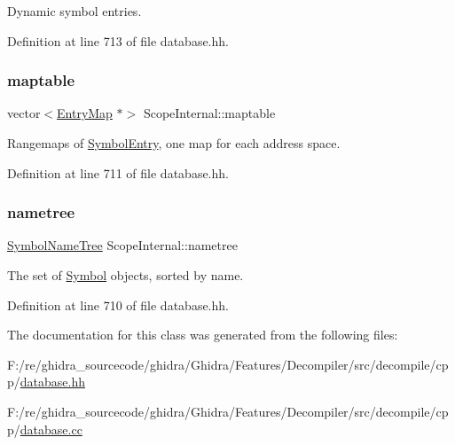 Dynamic symbol entries. 



Definition at line 713 of file database.\+hh.

\mbox{\label{class_scope_internal_ab5658fe9f8073010df73298690099872}} 
\subsubsection{\texorpdfstring{maptable}{maptable}}
{\footnotesize\ttfamily vector$<$\mbox{\hyperlink{database_8hh_a44a8ea0c0009b316b2651d374e5d4260}{Entry\+Map}} $\ast$$>$ Scope\+Internal\+::maptable\hspace{0.3cm}{\ttfamily [protected]}}



Rangemaps of \mbox{\hyperlink{class_symbol_entry}{Symbol\+Entry}}, one map for each address space. 



Definition at line 711 of file database.\+hh.

\mbox{\label{class_scope_internal_ad4084595095b578e1c8fd25301ffb02d}} 
\subsubsection{\texorpdfstring{nametree}{nametree}}
{\footnotesize\ttfamily \mbox{\hyperlink{database_8hh_a6ed1db9b39a7f86a7a00b392bbe3f0d1}{Symbol\+Name\+Tree}} Scope\+Internal\+::nametree\hspace{0.3cm}{\ttfamily [protected]}}



The set of \mbox{\hyperlink{class_symbol}{Symbol}} objects, sorted by name. 



Definition at line 710 of file database.\+hh.



The documentation for this class was generated from the following files\+:\begin{DoxyCompactItemize}
\item 
F\+:/re/ghidra\+\_\+sourcecode/ghidra/\+Ghidra/\+Features/\+Decompiler/src/decompile/cpp/\mbox{\hyperlink{database_8hh}{database.\+hh}}\item 
F\+:/re/ghidra\+\_\+sourcecode/ghidra/\+Ghidra/\+Features/\+Decompiler/src/decompile/cpp/\mbox{\hyperlink{database_8cc}{database.\+cc}}\end{DoxyCompactItemize}
